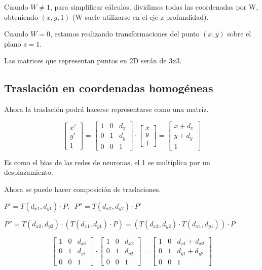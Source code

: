 Cuando $W\neq 1$, para simplificar cálculos, dividimos todas las coordenadas por W, obteniendo $( x , y , 1 )$ (W suele utilizarse en el eje z profundidad).

Cuando $W = 0$, estamos realizando transformaciones del punto $( x , y )$ sobre el plano $z = 1$.

Las matrices que representan puntos en 2D serán de 3x3.

\subsection{Traslación en coordenadas homogéneas}
Ahora la traslación podrá hacerse representarse como una matriz.

$$\left[\begin{matrix}
x' \\ y' \\ 1
\end{matrix}\right] =
\left[\begin{matrix}
1 & 0 & d_x \\ 0 & 1 & d_y \\ 0 & 0 & 1
\end{matrix}\right] \cdot
\left[\begin{matrix}
x \\ y \\ 1
\end{matrix}\right]=
\left[\begin{matrix}
x + d_x \\ y + d_y \\ 1
\end{matrix}\right]$$

Es como el bias de las redes de neuronas, el 1 se multiplica por un desplazamiento.

Ahora se puede hacer composición de traslaciones.

$P'=T(d_{x1},d_{y1}) \cdot P; \;\;P''=T(d_{x2},d_{y2}) \cdot P'$

$P''=T(d_{x2},d_{y2}) \cdot (T(d_{x1},d_{y1}) \cdot P)=(T(d_{x2},d_{y2}) \cdot T(d_{x1},d_{y1})) \cdot P$

$$\left[\begin{matrix}
1 & 0 & d_{x1} \\ 0 & 1 & d_{y1} \\ 0 & 0 & 1
\end{matrix}\right] \cdot
\left[\begin{matrix}
1 & 0 & d_{x2} \\ 0 & 1 & d_{y2} \\ 0 & 0 & 1
\end{matrix}\right]=
\left[\begin{matrix}
1 & 0 & d_{x1}+d_{x2} \\ 0 & 1 & d_{y1}+d_{y2} \\ 0 & 0 & 1
\end{matrix}\right]$$

